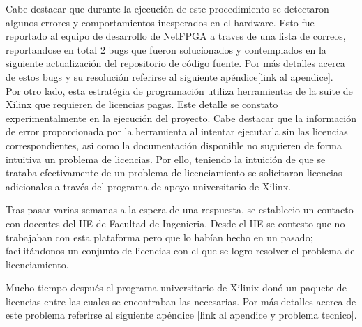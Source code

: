 Cabe destacar que durante la ejecuci\'on de este procedimiento se detectaron algunos errores y comportamientos inesperados en el hardware. Esto fue reportado al equipo de desarrollo de NetFPGA a traves de una lista de correos, reportandose en total 2 bugs que fueron solucionados y contemplados en la siguiente actualizaci\'on del repositorio de c\'odigo fuente. Por m\'as detalles acerca de estos bugs y su resoluci\'on referirse al siguiente ap\'endice[link al apendice].\\

Por otro lado, esta estrat\'egia de programaci\'on utiliza herramientas de la suite de Xilinx que requieren de licencias pagas. Este detalle se constato experimentalmente en la ejecuci\'on del proyecto. Cabe destacar que la informaci\'on de error proporcionada por la herramienta al intentar ejecutarla sin las licencias correspondientes, asi como la documentaci\'on disponible no suguieren de forma intuitiva un problema de licencias. Por ello, teniendo la intuici\'on de que se trataba efectivamente de un problema de licenciamiento se solicitaron licencias adicionales a trav\'es del programa de apoyo universitario de Xilinx.

Tras pasar varias semanas a la espera de una respuesta, se establecio un contacto con docentes del IIE de Facultad de Ingenieria. Desde el IIE se contesto que no trabajaban con esta plataforma pero que lo hab\'ian hecho en un pasado; facilit\'andonos un conjunto de licencias con el que se logro resolver el problema de licenciamiento. 

Mucho tiempo despu\'es el programa universitario de Xilinix don\'o un paquete de licencias entre las cuales se encontraban las necesarias. Por m\'as detalles acerca de este problema referirse al siguiente ap\'endice [link al apendice y problema tecnico].


